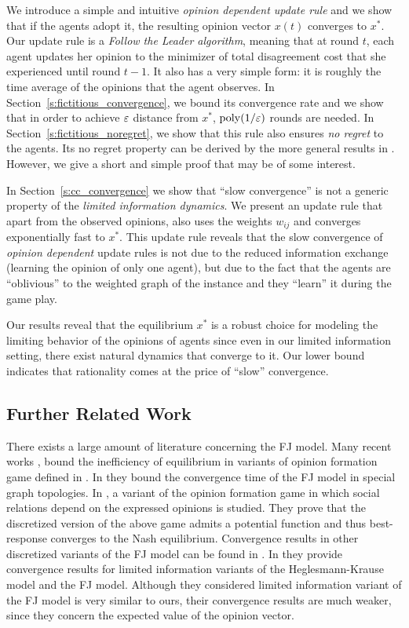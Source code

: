 We introduce a simple and intuitive \emph{opinion dependent update rule} and we
show that if the agents adopt it, the resulting opinion vector $x(t)$ converges
to $x^*$.  Our update rule is a \emph{Follow the Leader algorithm}, meaning that
at round $t$, each agent updates her
opinion to the minimizer of total disagreement cost that she experienced until
round $t-1$.  It also has a very simple form: it is roughly the time average of
the opinions that the agent observes.  In Section~\ref{s:fictitious_convergence},
we bound its convergence rate and we show that in order to achieve $\varepsilon$ distance
from $x^*$, $\mathrm{poly}(1/\varepsilon)$ rounds are needed.  In Section~\ref{s:fictitious_noregret},
we show that this rule also ensures \emph{no regret} to the agents.  Its no regret
property can be derived by the more general results in \cite{HAK07}.  However, we
give a short and simple proof that may be of some interest.

In Section~\ref{s:cc_convergence} we show that \enquote{slow convergence} is
not a generic property of the \emph{limited information dynamics}.  We present
an update rule that apart from the observed opinions, also uses the weights
$w_{ij}$ and converges exponentially fast to $x^*$.  This update rule reveals
that the slow convergence of \emph{opinion dependent} update rules is not due
to the reduced information exchange (learning the opinion of only one agent),
but due to the fact that the agents are \enquote{oblivious} to the weighted
graph of the instance and they \enquote{learn} it during the game play.

Our results reveal that the equilibrium $x^*$ is a robust choice for modeling the
limiting behavior of the opinions of agents since even in our limited information
setting, there exist natural dynamics that converge to it.  Our lower bound
indicates that rationality comes at the price of \enquote{slow} convergence.

\subsection{Further Related Work}

There exists a large amount of literature concerning the FJ model.  Many recent
works \cite{BGM13,CKO13}, \cite{BFM16,EFHS17} bound the inefficiency of
equilibrium in variants of opinion formation game defined in \cite{BKO11}. In
\cite{GS14} they bound the convergence time of the FJ model in special graph
topologies.  In \cite{BFM16}, a variant of the opinion formation game in which
social relations depend on the expressed opinions is studied.  They prove that
the discretized version of the above game admits a potential function and thus
best-response converges to the Nash equilibrium.  Convergence results in other
discretized variants of the FJ model can be found in \cite{YOASS13,FGV16}. In
\cite{FPS16} they provide convergence results for limited information variants
of the Heglesmann-Krause model \cite{HK} and the FJ model. Although they
considered limited information variant of the FJ model is very similar to ours,
their convergence results are much weaker, since they concern the expected
value of the opinion vector.

